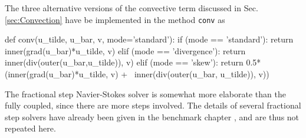 The three alternative versions of the convective term discussed in Sec. \ref{sec:Convection} have be implemented in the method {\fontsize{12pt}{12pt}\texttt{conv}} as
\begin{fenicscode}{0.9}
def conv(u_tilde, u_bar, v, mode='standard'):
    if (mode == 'standard'):
        return inner(grad(u_bar)*u_tilde, v)
    elif (mode == 'divergence'):
        return inner(div(outer(u_bar,u_tilde)), v)
    elif (mode == 'skew'):
        return 0.5*(inner(grad(u_bar)*u_tilde, v) + \
        inner(div(outer(u_bar, u_tilde)), v))
\end{fenicscode}
The fractional step Navier-Stokes solver is somewhat more elaborate than the fully coupled, since there are more steps involved. The details of several fractional step solvers have already been given in the benchmark chapter \cite{nsbench}, and are thus not repeated here.

